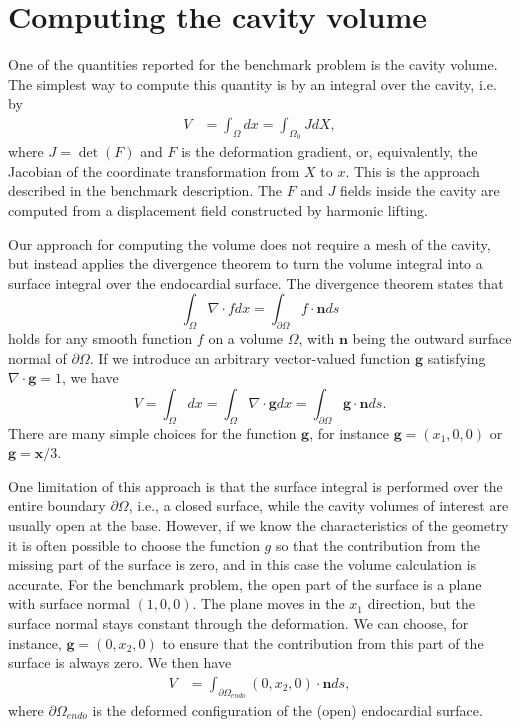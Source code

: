 \documentclass[a4paper,10pt]{article}
\begin{document}
\section{Computing the cavity volume}
One of the quantities reported for the benchmark problem is the cavity volume.
The simplest way to compute this quantity is by an integral over the cavity, i.e.
by
\begin{align}
V &= \int_\Omega dx = \int_{\Omega_0} J dX,
\label{vol0}\end{align}
where $J=\det(F)$ and $F$ is the deformation gradient, or,
equivalently, the Jacobian of the coordinate transformation from $X$
to $x$. This is the approach described in the benchmark description.
The $F$ and $J$ fields inside the cavity are computed from a displacement field
constructed by harmonic lifting.

Our approach for computing the volume does not require a mesh of the cavity,
but instead applies the divergence theorem to turn the volume integral into
a surface integral over the endocardial surface. The divergence theorem states
that
\[
\int_\Omega \nabla\cdot f dx = \int_{\partial\Omega} f\cdot \mathbf{n} ds
\]
holds for any smooth function $f$ on a volume $\Omega$, with $\mathbf{n}$ being the
outward surface normal of $\partial\Omega$. If we introduce an
arbitrary vector-valued function $\mathbf{g}$ satisfying $\nabla\cdot \mathbf{g} = 1$, we have
\[
V =\int_{\Omega} dx = \int_{\Omega}\nabla\cdot \mathbf{g}dx
= \int_{\partial\Omega}\mathbf{g}\cdot\mathbf{n}ds .
\]
There are many simple choices for the function $\mathbf{g}$, for instance $\mathbf{g}=(x_1,0,0)$ or
$\mathbf{g}=\mathbf{x}/3$.

One limitation of this approach is that the surface integral is performed over the
entire boundary $\partial\Omega$, i.e., a closed surface, while the cavity volumes
of interest are usually open at the base. However, if we know the characteristics
of the geometry it is often possible to choose the function $g$ so that the
contribution from the missing part of the surface is zero, and in this case the
volume calculation is accurate. For the benchmark problem, the open
part of the surface is a plane with surface normal $(1,0,0)$. The plane moves
in the $x_1$ direction, but the surface normal stays constant through the
deformation. We can choose, for instance, $\mathbf{g}=(0,x_2,0)$ to ensure that the
contribution from this part of the surface is always zero. We then have
\begin{align}
V &= \int_{\partial\Omega_{endo}}(0,x_2,0) \cdot\mathbf{n}ds ,
\label{vol1}\end{align}
where $\partial\Omega_{endo}$ is the deformed configuration of the (open)
endocardial surface.
\end{document}
